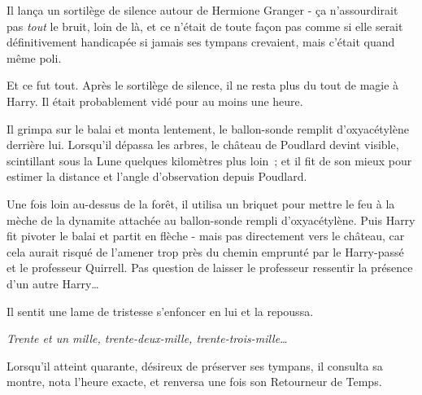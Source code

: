 Il lança un sortilège de silence autour de Hermione Granger - ça n'assourdirait pas \emph{tout} le bruit, loin de là, et ce n'était de toute façon pas comme si elle serait définitivement handicapée si jamais ses tympans crevaient, mais c'était quand même poli.

Et ce fut tout. Après le sortilège de silence, il ne resta plus du tout de magie à Harry. Il était probablement vidé pour au moins une heure.

Il grimpa sur le balai et monta lentement, le ballon-sonde remplit d'oxyacétylène derrière lui. Lorsqu'il dépassa les arbres, le château de Poudlard devint visible, scintillant sous la Lune quelques kilomètres plus loin~; et il fit de son mieux pour estimer la distance et l'angle d'observation depuis Poudlard.

Une fois loin au-dessus de la forêt, il utilisa un briquet pour mettre le feu à la mèche de la dynamite attachée au ballon-sonde rempli d'oxyacétylène. Puis Harry fit pivoter le balai et partit en flèche - mais pas directement vers le château, car cela aurait risqué de l'amener trop près du chemin emprunté par le Harry-passé et le professeur Quirrell. Pas question de laisser le professeur ressentir la présence d'un autre Harry…

Il sentit une lame de tristesse s'enfoncer en lui et la repoussa.

\emph{Trente et un mille, trente-deux-mille, trente-trois-mille…}

Lorsqu'il atteint quarante, désireux de préserver ses tympans, il consulta sa montre, nota l'heure exacte, et renversa une fois son Retourneur de Temps. 


